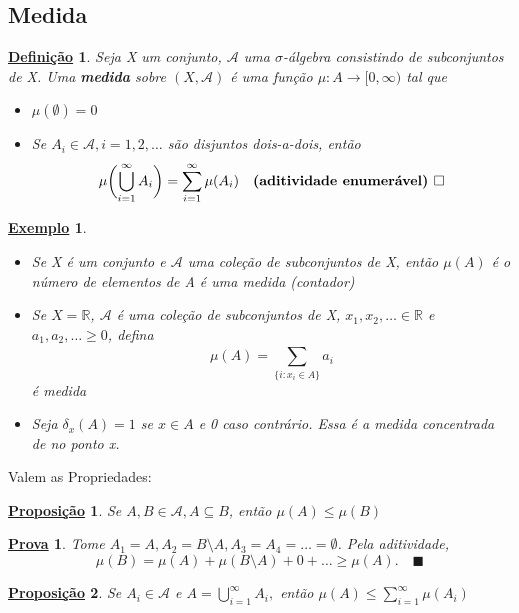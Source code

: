 \documentclass{article}
\newtheorem*{def*}{\underline{Defini\c c\~ao}}
\newtheorem*{prop*}{\underline{Proposi\c c\~ao}}
\newtheorem{example}{\underline{Exemplo}}
\newtheorem*{proof*}{\underline{Prova}}
\renewcommand\qedsymbol{$\blacksquare$}
\begin{document}
\subsection{Medida}
\begin{def*}
	Seja X um conjunto, \(\mathcal{A}\) uma \(\sigma \)-álgebra consistindo de subconjuntos de X. Uma \textbf{medida} sobre \((X, \mathcal{A})\) é uma função \(\mu:A\rightarrow [0, \infty) \) tal que
	\begin{itemize}
		\item[1)] \(\mu (\emptyset ) = 0\)
		\item[2)] Se \(A_{i}\in \mathcal{A}, i = 1, 2, \dotsc \) são disjuntos dois-a-dois, então
		      \[
			      \mu \biggl(\bigcup_{i=1}^{\infty}A_{i}\biggr) = \sum\limits_{i=1}^{\infty}\mu (A_{i})\quad \text{\textbf{(aditividade enumerável) }} \square
		      \]
	\end{itemize}
\end{def*}
\begin{example}
	\begin{itemize}
		\item[1)] Se X é um conjunto e \(\mathcal{A}\) uma coleção de subconjuntos de X, então \(\mu (A)\) é o número de elementos de A é uma medida (contador)
		\item[2)] Se \(X = \mathbb{R}\), \(\mathcal{A}\) é uma coleção de subconjuntos de X, \(x_{1}, x_{2}, \dotsc \in \mathbb{R}\) e \(a_{1}, a_2, \dotsc \geq 0\), defina
		      \[
			      \mu (A) = \sum\limits_{\{i: x_{i}\in A\}}^{}a_{i}
		      \]
		      é medida
		\item[3)] Seja \(\delta_x (A) = 1\) se \(x\in A\) e 0 caso contrário. Essa é a medida concentrada de no ponto x.

	\end{itemize}
\end{example}
Valem as Propriedades:
\begin{prop*}
	Se \(A, B\in \mathcal{A}, A\subseteq B\), então \(\mu (A) \leq \mu (B)\)
\end{prop*}
\begin{proof*}
	Tome \(A_{1} = A, A_{2} = B\setminus{A}, A_{3} = A_{4} = \dotsc  = \emptyset \). Pela aditividade,
	\[
		\mu (B) = \mu (A) + \mu(B\setminus{A}) + 0 +\dotsc  \geq \mu (A). \quad \text{\qedsymbol}
	\]
\end{proof*}
\begin{prop*}
	Se \(A_{i}\in \mathcal{A}\) e \(A = \bigcup_{i=1}^{\infty}A_{i},\) então \(\mu (A) \leq \sum\limits_{i=1}^{\infty}\mu (A_{i})\)
\end{prop*}
\end{document}
